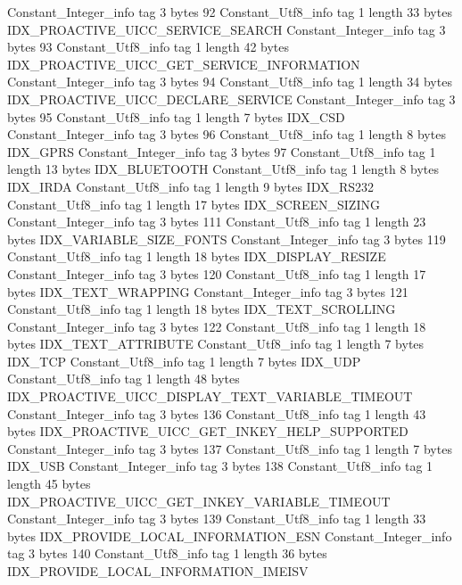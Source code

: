 {{		Constant_Integer_info {
			tag	3
			bytes	92
		}
		Constant_Utf8_info {
			tag	1
			length	33
			bytes	IDX_PROACTIVE_UICC_SERVICE_SEARCH
		}
		Constant_Integer_info {
			tag	3
			bytes	93
		}
		Constant_Utf8_info {
			tag	1
			length	42
			bytes	IDX_PROACTIVE_UICC_GET_SERVICE_INFORMATION
		}
		Constant_Integer_info {
			tag	3
			bytes	94
		}
		Constant_Utf8_info {
			tag	1
			length	34
			bytes	IDX_PROACTIVE_UICC_DECLARE_SERVICE
		}
		Constant_Integer_info {
			tag	3
			bytes	95
		}
		Constant_Utf8_info {
			tag	1
			length	7
			bytes	IDX_CSD
		}
		Constant_Integer_info {
			tag	3
			bytes	96
		}
		Constant_Utf8_info {
			tag	1
			length	8
			bytes	IDX_GPRS
		}
		Constant_Integer_info {
			tag	3
			bytes	97
		}
		Constant_Utf8_info {
			tag	1
			length	13
			bytes	IDX_BLUETOOTH
		}
		Constant_Utf8_info {
			tag	1
			length	8
			bytes	IDX_IRDA
		}
		Constant_Utf8_info {
			tag	1
			length	9
			bytes	IDX_RS232
		}
		Constant_Utf8_info {
			tag	1
			length	17
			bytes	IDX_SCREEN_SIZING
		}
		Constant_Integer_info {
			tag	3
			bytes	111
		}
		Constant_Utf8_info {
			tag	1
			length	23
			bytes	IDX_VARIABLE_SIZE_FONTS
		}
		Constant_Integer_info {
			tag	3
			bytes	119
		}
		Constant_Utf8_info {
			tag	1
			length	18
			bytes	IDX_DISPLAY_RESIZE
		}
		Constant_Integer_info {
			tag	3
			bytes	120
		}
		Constant_Utf8_info {
			tag	1
			length	17
			bytes	IDX_TEXT_WRAPPING
		}
		Constant_Integer_info {
			tag	3
			bytes	121
		}
		Constant_Utf8_info {
			tag	1
			length	18
			bytes	IDX_TEXT_SCROLLING
		}
		Constant_Integer_info {
			tag	3
			bytes	122
		}
		Constant_Utf8_info {
			tag	1
			length	18
			bytes	IDX_TEXT_ATTRIBUTE
		}
		Constant_Utf8_info {
			tag	1
			length	7
			bytes	IDX_TCP
		}
		Constant_Utf8_info {
			tag	1
			length	7
			bytes	IDX_UDP
		}
		Constant_Utf8_info {
			tag	1
			length	48
			bytes	IDX_PROACTIVE_UICC_DISPLAY_TEXT_VARIABLE_TIMEOUT
		}
		Constant_Integer_info {
			tag	3
			bytes	136
		}
		Constant_Utf8_info {
			tag	1
			length	43
			bytes	IDX_PROACTIVE_UICC_GET_INKEY_HELP_SUPPORTED
		}
		Constant_Integer_info {
			tag	3
			bytes	137
		}
		Constant_Utf8_info {
			tag	1
			length	7
			bytes	IDX_USB
		}
		Constant_Integer_info {
			tag	3
			bytes	138
		}
		Constant_Utf8_info {
			tag	1
			length	45
			bytes	IDX_PROACTIVE_UICC_GET_INKEY_VARIABLE_TIMEOUT
		}
		Constant_Integer_info {
			tag	3
			bytes	139
		}
		Constant_Utf8_info {
			tag	1
			length	33
			bytes	IDX_PROVIDE_LOCAL_INFORMATION_ESN
		}
		Constant_Integer_info {
			tag	3
			bytes	140
		}
		Constant_Utf8_info {
			tag	1
			length	36
			bytes	IDX_PROVIDE_LOCAL_INFORMATION_IMEISV
}}}

